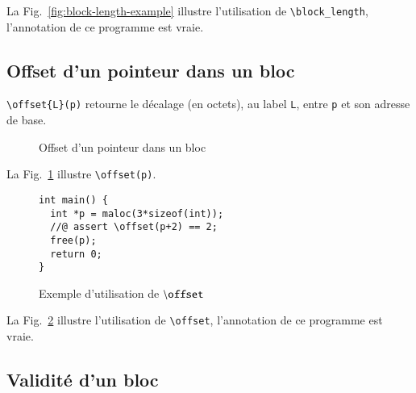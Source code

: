 \documentclass[french]{spimufcphdthesis}
\begin{document}
La Fig.~\ref{fig:block-length-example} illustre l'utilisation de
\lstinline{\block_length}, l'annotation de ce programme est vraie.


\subsection{Offset d'un pointeur dans un bloc}

\lstinline'\offset{L}(p)' retourne le décalage (en octets), au label
\lstinline{L}, entre \lstinline{p} et son adresse de base.


\begin{figure}[h]
  \begin{center}
  \end{center}
  \caption{Offset d'un pointeur dans un bloc}
  \label{fig:offset}
\end{figure}

La Fig.~\ref{fig:offset} illustre \lstinline{\offset(p)}.


\begin{figure}[h]
\begin{lstlisting}
int main() {
  int *p = maloc(3*sizeof(int));
  //@ assert \offset(p+2) == 2;
  free(p);
  return 0;
}
\end{lstlisting}
\caption{Exemple d'utilisation de ${\tt \backslash offset}$}
\label{fig:offset-example}
\end{figure}

 La
Fig.~\ref{fig:offset-example} illustre l'utilisation de
\lstinline{\offset}, l'annotation de ce programme est vraie.


\subsection{Validité d'un bloc}
\end{document}
